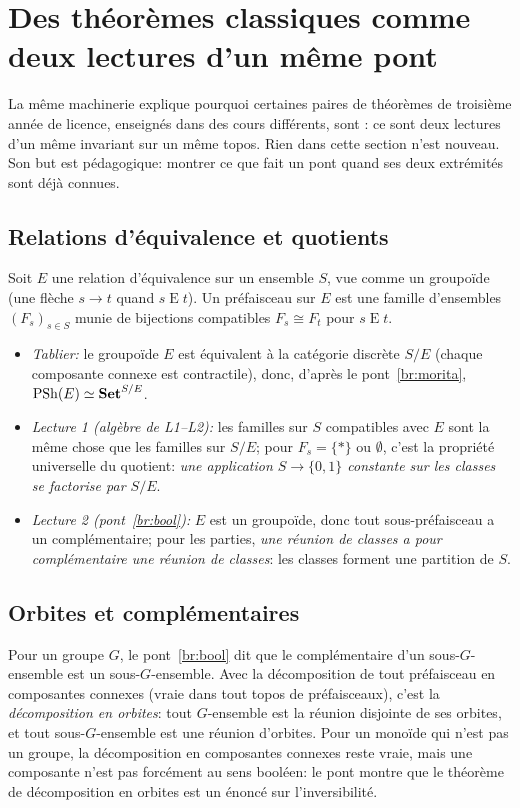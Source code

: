 \section{Des théorèmes classiques comme deux lectures d'un même pont}\label{sec:equivalences}

La même machinerie explique pourquoi certaines paires de théorèmes de troisième année de licence, enseignés dans des cours différents, sont : ce sont deux lectures d'un même invariant sur un même topos. Rien dans cette section n'est nouveau. Son but est pédagogique: montrer ce que fait un pont quand ses deux extrémités sont déjà connues.

\subsection{Relations d'équivalence et quotients}

Soit $E$ une relation d'équivalence sur un ensemble $S$, vue comme un groupoïde (une flèche $s\to t$ quand $s\mathrel E t$). Un préfaisceau sur $E$ est une famille d'ensembles $(F_s)_{s\in S}$ munie de bijections compatibles $F_s\cong F_t$ pour $s\mathrel E t$.

\begin{itemize}
\item \emph{Tablier:} le groupoïde $E$ est équivalent à la catégorie discrète $S/E$ (chaque composante connexe est contractile), donc, d'après le pont~\ref{br:morita}, $\mathrm{PSh}(E)\simeq\mathbf{Set}^{S/E}$.
\item \emph{Lecture 1 (algèbre de L1--L2):} les familles sur $S$ compatibles avec $E$ sont la même chose que les familles sur $S/E$; pour $F_s = \{\ast\}$ ou $\emptyset$, c'est la propriété universelle du quotient: \emph{une application $S\to\{0,1\}$ constante sur les classes se factorise par $S/E$}.
\item \emph{Lecture 2 (pont~\ref{br:bool}):} $E$ est un groupoïde, donc tout sous-préfaisceau a un complémentaire; pour les parties, \emph{une réunion de classes a pour complémentaire une réunion de classes}: les classes forment une partition de $S$.
\end{itemize}

\subsection{Orbites et complémentaires}

Pour un groupe $G$, le pont~\ref{br:bool} dit que le complémentaire d'un sous-$G$-ensemble est un sous-$G$-ensemble. Avec la décomposition de tout préfaisceau en composantes connexes (vraie dans tout topos de préfaisceaux), c'est la \emph{décomposition en orbites}: tout $G$-ensemble est la réunion disjointe de ses orbites, et tout sous-$G$-ensemble est une réunion d'orbites. Pour un monoïde qui n'est pas un groupe, la décomposition en composantes connexes reste vraie, mais une composante n'est pas forcément  au sens booléen: le pont montre que le théorème de décomposition en orbites est un énoncé sur l'inversibilité.

